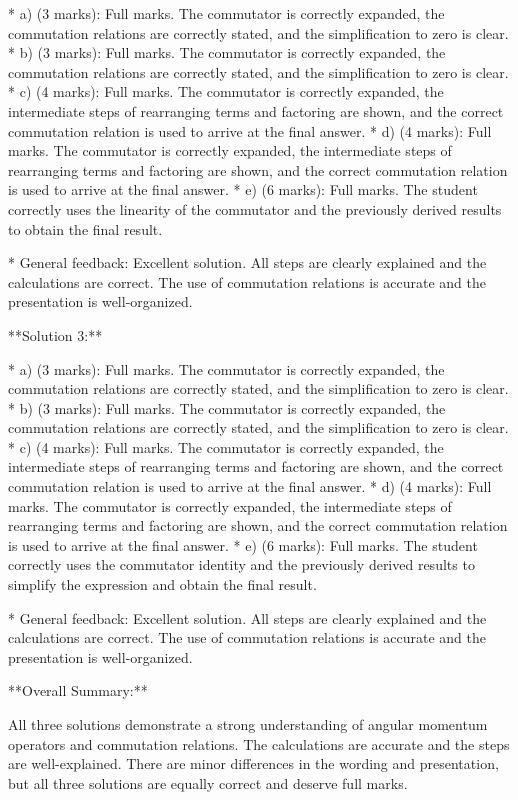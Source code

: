 \documentclass[a4paper,11pt]{article}
\begin{document}
* a) (3 marks): Full marks. The commutator is correctly expanded, the commutation relations are correctly stated, and the simplification to zero is clear.
* b) (3 marks): Full marks. The commutator is correctly expanded, the commutation relations are correctly stated, and the simplification to zero is clear.
* c) (4 marks): Full marks. The commutator is correctly expanded, the intermediate steps of rearranging terms and factoring are shown, and the correct commutation relation is used to arrive at the final answer.
* d) (4 marks): Full marks. The commutator is correctly expanded, the intermediate steps of rearranging terms and factoring are shown, and the correct commutation relation is used to arrive at the final answer.
* e) (6 marks): Full marks. The student correctly uses the linearity of the commutator and the previously derived results to obtain the final result. 

* General feedback: Excellent solution. All steps are clearly explained and the calculations are correct. The use of commutation relations is accurate and the presentation is well-organized.

**Solution 3:**

* a) (3 marks): Full marks. The commutator is correctly expanded, the commutation relations are correctly stated, and the simplification to zero is clear.
* b) (3 marks): Full marks. The commutator is correctly expanded, the commutation relations are correctly stated, and the simplification to zero is clear.
* c) (4 marks): Full marks. The commutator is correctly expanded, the intermediate steps of rearranging terms and factoring are shown, and the correct commutation relation is used to arrive at the final answer.
* d) (4 marks): Full marks. The commutator is correctly expanded, the intermediate steps of rearranging terms and factoring are shown, and the correct commutation relation is used to arrive at the final answer.
* e) (6 marks): Full marks. The student correctly uses the commutator identity and the previously derived results to simplify the expression and obtain the final result. 

* General feedback: Excellent solution. All steps are clearly explained and the calculations are correct. The use of commutation relations is accurate and the presentation is well-organized.

**Overall Summary:**

All three solutions demonstrate a strong understanding of angular momentum operators and commutation relations. The calculations are accurate and the steps are well-explained. There are minor differences in the wording and presentation, but all three solutions are equally correct and deserve full marks.
\end{document}
